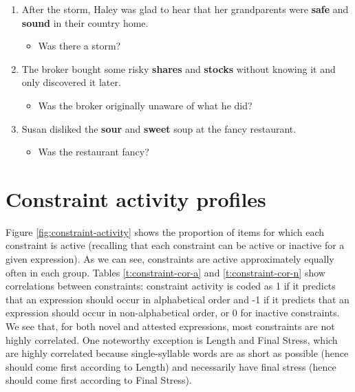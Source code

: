 \documentclass[authoryear]{elsarticle}
\begin{document}
\begin{enumerate}
\item After the storm, Haley was glad to hear that her grandparents were \textbf{safe} and \textbf{sound} in their country home.	\begin{itemize} \item Was there a storm?\end{itemize}
\item The broker bought some risky \textbf{shares} and \textbf{stocks} without knowing it and only discovered it later.	\begin{itemize} \item Was the broker originally unaware of what he did?\end{itemize}
\item Susan disliked the \textbf{sour} and \textbf{sweet} soup at the fancy restaurant.	\begin{itemize} \item Was the restaurant fancy?\end{itemize}
\end{enumerate}

\section{Constraint activity profiles}\label{a:constraints}
Figure \ref{fig:constraint-activity} shows the proportion of items for which each constraint is active (recalling that each constraint can be active or inactive for a given expression). As we can see, constraints are active approximately equally often in each group. Tables \ref{t:constraint-cor-a} and \ref{t:constraint-cor-n} show correlations between constraints: constraint activity is coded as 1 if it predicts that an expression should occur in alphabetical order and -1 if it predicts that an expression should occur in non-alphabetical order, or 0 for inactive constraints. We see that, for both novel and attested expressions, most constraints are not highly correlated. One noteworthy exception is Length and Final Stress, which are highly correlated because single-syllable words are as short as possible (hence should come first according to Length) and necessarily have final stress (hence should come first according to Final Stress).
\end{document}
